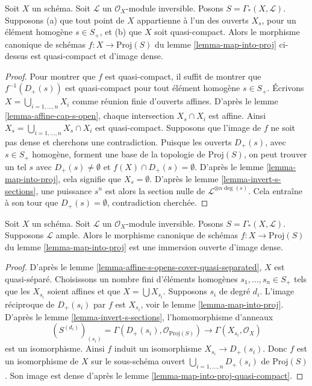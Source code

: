 \begin{lemma}
\label{lemma-map-into-proj-quasi-compact}
Soit $X$ un schéma. Soit $\mathcal{L}$ un $\mathcal{O}_X$-module inversible.
Posons $S = \Gamma_*(X, \mathcal{L})$.
Supposons (a) que tout point de $X$ appartienne à l'un
des ouverts $X_s$, pour un élément homogène $s \in S_{+}$, et (b)
que $X$ soit quasi-compact. Alors le morphisme canonique de schémas
$f : X \longrightarrow \text{Proj}(S)$ du lemme \ref{lemma-map-into-proj}
ci-dessus est quasi-compact et d'image dense.
\end{lemma}

\begin{proof}
Pour montrer que $f$ est quasi-compact, il suffit de montrer que $f^{-1}(D_{+}(s))$
est quasi-compact pour tout élément homogène $s \in S_{+}$. Écrivons
$X = \bigcup_{i = 1, \ldots, n} X_i$ comme réunion finie
d'ouverts affines. D'après le lemme \ref{lemma-affine-cap-s-open}, chaque intersection
$X_s \cap X_i$ est affine. Ainsi $X_s = \bigcup_{i = 1, \ldots, n} X_s \cap X_i$
est quasi-compact. Supposons que l'image de $f$ ne soit pas dense et
cherchons une contradiction. Puisque les ouverts $D_+(s)$, avec $s \in S_+$ homogène,
forment une base de la topologie de $\text{Proj}(S)$, on peut trouver un
tel $s$ avec $D_+(s) \not = \emptyset$ et $f(X) \cap D_+(s) = \emptyset$.
D'après le lemme \ref{lemma-map-into-proj},
cela signifie que $X_s = \emptyset$. D'après le lemme \ref{lemma-invert-s-sections},
une puissance $s^n$ est alors la section nulle de
$\mathcal{L}^{\otimes n\deg(s)}$.
Cela entraîne à son tour que $D_+(s) = \emptyset$,
contradiction cherchée.
\end{proof}

\begin{lemma}
\label{lemma-ample-immersion-into-proj}
Soit $X$ un schéma. Soit $\mathcal{L}$ un $\mathcal{O}_X$-module inversible.
Posons $S = \Gamma_*(X, \mathcal{L})$.
Supposons $\mathcal{L}$ ample. Alors le morphisme canonique de schémas
$f : X \longrightarrow \text{Proj}(S)$ du lemme \ref{lemma-map-into-proj}
est une immersion ouverte d'image dense.
\end{lemma}

\begin{proof}
D'après le lemme \ref{lemma-affine-s-opens-cover-quasi-separated},
 $X$ est quasi-séparé. Choisissons un nombre fini d'éléments homogènes
$s_1, \ldots, s_n \in S_{+}$ tels
que les $X_{s_i}$ soient affines et que $X = \bigcup X_{s_i}$.
Supposons $s_i$ de degré $d_i$. L'image réciproque de
$D_{+}(s_i)$ par $f$ est $X_{s_i}$, voir le lemme \ref{lemma-map-into-proj}.
D'après le lemme \ref{lemma-invert-s-sections}, l'homomorphisme d'anneaux
$$
(S^{(d_i)})_{(s_i)} = \Gamma(D_{+}(s_i), \mathcal{O}_{\text{Proj}(S)})
\longrightarrow
\Gamma(X_{s_i}, \mathcal{O}_X)
$$
est un isomorphisme. Ainsi $f$ induit un isomorphisme
$X_{s_i} \to D_{+}(s_i)$. Donc $f$ est un isomorphisme de $X$ sur le
sous-schéma ouvert $\bigcup_{i = 1, \ldots, n} D_{+}(s_i)$ de $\text{Proj}(S)$.
Son image est dense d'après le lemme \ref{lemma-map-into-proj-quasi-compact}.
\end{proof}

